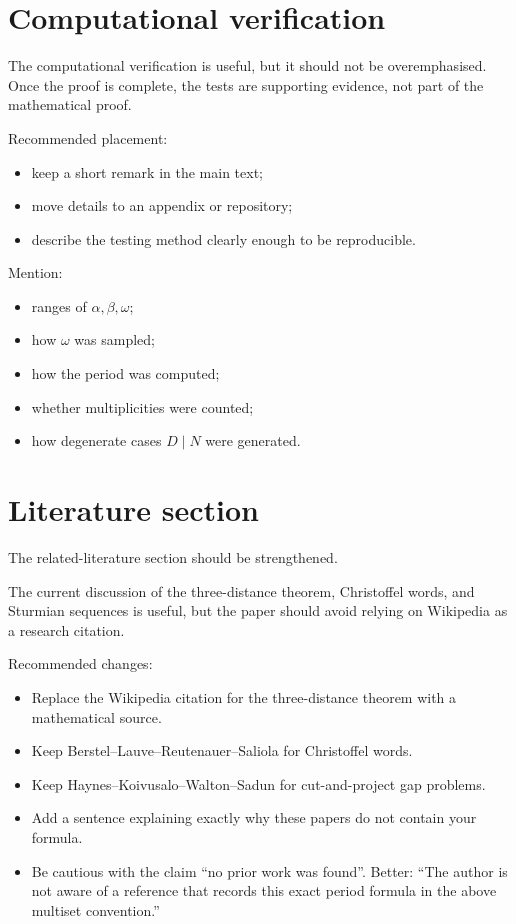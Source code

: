 \documentclass[11pt]{article}
\begin{document}
\section*{Computational verification}

The computational verification is useful, but it should not be overemphasised.
Once the proof is complete, the tests are supporting evidence, not part of the
mathematical proof.

Recommended placement:

\begin{itemize}
    \item keep a short remark in the main text;
    \item move details to an appendix or repository;
    \item describe the testing method clearly enough to be reproducible.
\end{itemize}

Mention:

\begin{itemize}
    \item ranges of \(\alpha,\beta,\omega\);
    \item how \(\omega\) was sampled;
    \item how the period was computed;
    \item whether multiplicities were counted;
    \item how degenerate cases \(D\mid N\) were generated.
\end{itemize}

\section*{Literature section}

The related-literature section should be strengthened.

The current discussion of the three-distance theorem, Christoffel words, and
Sturmian sequences is useful, but the paper should avoid relying on Wikipedia
as a research citation.

Recommended changes:

\begin{itemize}
    \item Replace the Wikipedia citation for the three-distance theorem with
    a mathematical source.

    \item Keep Berstel--Lauve--Reutenauer--Saliola for Christoffel words.

    \item Keep Haynes--Koivusalo--Walton--Sadun for cut-and-project gap
    problems.

    \item Add a sentence explaining exactly why these papers do not contain
    your formula.

    \item Be cautious with the claim ``no prior work was found''.  Better:
    ``The author is not aware of a reference that records this exact period
    formula in the above multiset convention.''
\end{itemize}
\end{document}
